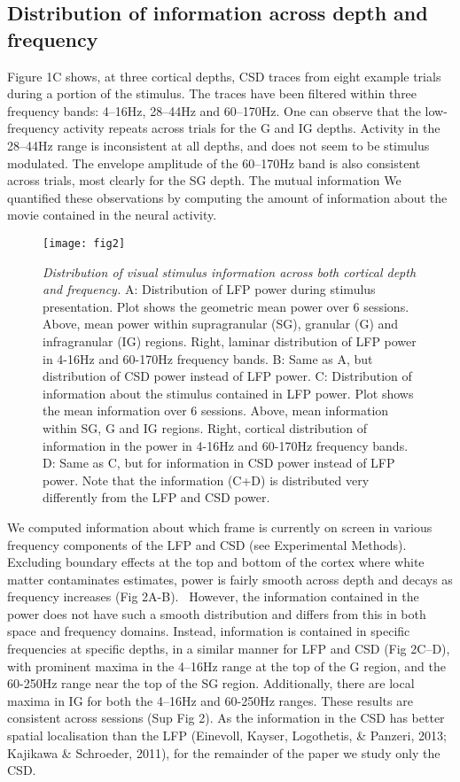 \subsection[Distribution of information across depth and frequency]{Distribution of information across depth and frequency}
Figure 1C shows, at three cortical depths, CSD traces from eight example trials during a portion of the stimulus. The traces have been filtered within three frequency bands: 4--16Hz, 28--44Hz and 60--170Hz. One can observe that the low-frequency activity repeats across trials for the G and IG depths. Activity in the 28--44Hz range is inconsistent at all depths, and does not seem to be stimulus modulated. The envelope amplitude of the 60--170Hz band is also consistent across trials, most clearly for the SG depth. The mutual information We quantified these observations by computing the amount of information about the movie contained in the neural activity.

\begin{figure}[htbp]
\centering \texttt{[image: fig2]}
%
\caption{%
\textit{Distribution of visual stimulus information across both cortical depth 
and frequency.}
A: Distribution of LFP power during stimulus presentation. Plot shows the geometric mean 
power over 6 sessions. Above, mean power within supragranular (SG), granular 
(G) and infragranular (IG) regions. Right, laminar distribution of LFP power in
4-16Hz and 60-170Hz frequency bands.
B: Same as A, but distribution of CSD power instead of LFP power.
C: Distribution of information about the stimulus contained in LFP power. Plot 
shows the mean information over 6 sessions. Above, mean information within SG, G 
and IG regions. Right, cortical distribution of information in the power in
4-16Hz and 60-170Hz frequency bands.
D: Same as C, but for information in CSD power instead of LFP power.
Note that the information (C+D) is distributed very differently from the LFP and CSD power.}%
\label{fig:lam_2}
\end{figure}

We computed information about which frame is currently on screen in various frequency components of the LFP and CSD (see Experimental Methods). Excluding boundary effects at the top and bottom of the cortex where white matter contaminates estimates, power is fairly smooth across depth and decays as frequency increases (Fig 2A-B). \ However, the information contained in the power does not have such a smooth distribution and differs from this in both space and frequency domains. Instead, information is contained in specific frequencies at specific depths, in a similar manner for LFP and CSD (Fig 2C--D), with prominent maxima in the 4--16Hz range at the top of the G region, and the 60-250Hz range near the top of the SG region. Additionally, there are local maxima in IG for both the 4--16Hz and 60-250Hz ranges. These results are consistent across sessions (Sup Fig 2). As the information in the CSD has better spatial localisation than the LFP (Einevoll, Kayser, Logothetis, \& Panzeri, 2013; Kajikawa \& Schroeder, 2011), for the remainder of the paper we study only the CSD.

